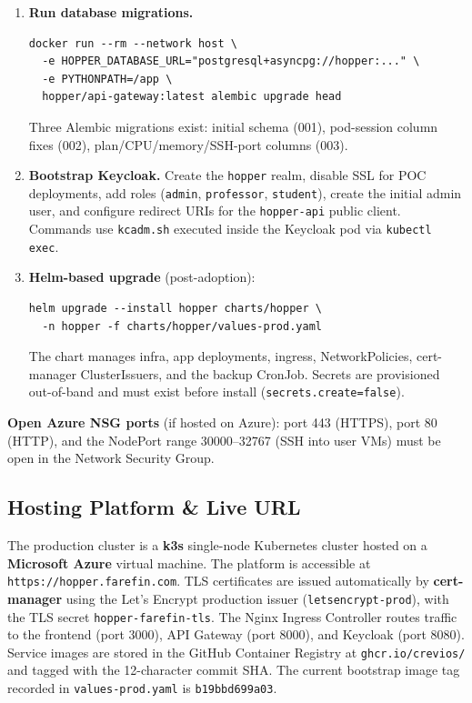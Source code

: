 \documentclass[12pt,a4paper]{article}
\begin{document}
\begin{enumerate}[leftmargin=1.5em]
  \item \textbf{Run database migrations.}
\begin{lstlisting}
docker run --rm --network host \
  -e HOPPER_DATABASE_URL="postgresql+asyncpg://hopper:..." \
  -e PYTHONPATH=/app \
  hopper/api-gateway:latest alembic upgrade head
\end{lstlisting}
        Three Alembic migrations exist: initial schema (001), pod-session
        column fixes (002), plan/CPU/memory/SSH-port columns (003).

  \item \textbf{Bootstrap Keycloak.}
        Create the \texttt{hopper} realm, disable SSL for POC deployments,
        add roles (\texttt{admin}, \texttt{professor}, \texttt{student}),
        create the initial admin user, and configure redirect URIs for the
        \texttt{hopper-api} public client. Commands use \texttt{kcadm.sh}
        executed inside the Keycloak pod via \texttt{kubectl exec}.

  \item \textbf{Helm-based upgrade} (post-adoption):
\begin{lstlisting}
helm upgrade --install hopper charts/hopper \
  -n hopper -f charts/hopper/values-prod.yaml
\end{lstlisting}
        The chart manages infra, app deployments, ingress, NetworkPolicies,
        cert-manager ClusterIssuers, and the backup CronJob. Secrets are
        provisioned out-of-band and must exist before install
        (\texttt{secrets.create=false}).
\end{enumerate}

\noindent\textbf{Open Azure NSG ports} (if hosted on Azure):
port 443 (HTTPS), port 80 (HTTP), and the NodePort range 30000--32767
(SSH into user VMs) must be open in the Network Security Group.

\subsection{Hosting Platform \& Live URL}

\begin{sloppypar}
The production cluster is a \textbf{k3s} single-node Kubernetes cluster
hosted on a \textbf{Microsoft Azure} virtual machine. The platform is
accessible at \texttt{https://hopper.farefin.com}.
TLS certificates are issued automatically by \textbf{cert-manager} using
the Let's Encrypt production issuer (\texttt{letsencrypt-prod}), with the
TLS secret \texttt{hopper-farefin-tls}.
The Nginx Ingress Controller routes traffic to the frontend (port 3000),
API Gateway (port 8000), and Keycloak (port 8080).
Service images are stored in the GitHub Container Registry at
\texttt{ghcr.io/crevios/} and tagged with the 12-character commit SHA.
The current bootstrap image tag recorded in \texttt{values-prod.yaml} is
\texttt{b19bbd699a03}.
\end{sloppypar}
\end{document}
